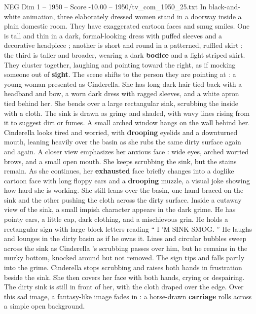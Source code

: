 \begin{textsample}{NEG Dim 1 – 1950 – Score -10.00 – 1950/tv\_com\_1950\_25.txt}  \label{ex:f1_neg_001}
In black-and-white animation, three elaborately dressed women stand in a doorway inside a plain domestic room.
They have exaggerated cartoon faces and smug smiles.
One is tall and thin in a dark, formal-looking dress with puffed sleeves and a decorative headpiece ; another is short and round in a patterned, ruffled skirt ; the third is taller and broader, wearing a dark \textbf{bodice} and a light striped skirt.
They cluster together, laughing and pointing toward the right, as if mocking someone out of \textbf{sight}.
The scene shifts to the person they are pointing at : a young woman presented as Cinderella.
She has long dark hair tied back with a headband and bow, a worn dark dress with ragged sleeves, and a white apron tied behind her.
She bends over a large rectangular sink, scrubbing the inside with a cloth.
The sink is drawn as grimy and shaded, with wavy lines rising from it to suggest dirt or fumes.
A small arched window hangs on the wall behind her.
Cinderella looks tired and worried, with \textbf{drooping} eyelids and a downturned mouth, leaning heavily over the basin as she rubs the same dirty surface again and again.
A closer view emphasizes her anxious face : wide eyes, arched worried brows, and a small open mouth.
She keeps scrubbing the sink, but the stains remain.
As she continues, her \textbf{exhausted} face briefly changes into a doglike cartoon face with long floppy ears and a \textbf{drooping} muzzle, a visual joke showing how hard she is working.
She still leans over the basin, one hand braced on the sink and the other pushing the cloth across the dirty surface.
Inside a cutaway view of the sink, a small impish character appears in the dark grime.
He has pointy ears, a little cap, dark clothing, and a mischievous grin.
He holds a rectangular sign with large block letters reading “ I ’M SINK SMOG. ” He laughs and lounges in the dirty basin as if he owns it.
Lines and circular bubbles sweep across the sink as Cinderella ’s scrubbing passes over him, but he remains in the murky bottom, knocked around but not removed.
The sign tips and falls partly into the grime.
Cinderella stops scrubbing and raises both hands in frustration beside the sink.
She then covers her face with both hands, crying or despairing.
The dirty sink is still in front of her, with the cloth draped over the edge.
Over this sad image, a fantasy-like image fades in : a horse-drawn \textbf{carriage} rolls across a simple open background.

\end{textsample}
